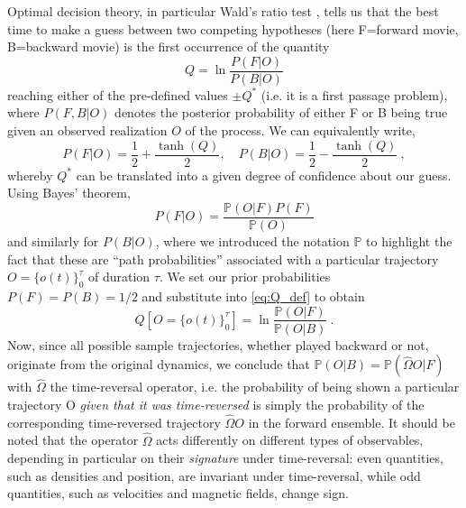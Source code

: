 Optimal decision theory, in particular Wald's ratio test \cite{PhysRevLett.115.250602}, tells us that the best time to make a guess between two competing hypotheses (here F=forward movie, B=backward movie) is the first occurrence of the quantity 
%
\begin{equation}\label{eq:Q_def}
    Q = \ln \frac{P(F|O)}{P(B|O)}
\end{equation}
%
reaching either of the pre-defined values $\pm Q^*$ (i.e. it is a first passage problem),
where $P(F,B|O)$ denotes the posterior probability of either F or B being true given an observed realization $O$ of the process. We can equivalently write,
%
\begin{equation}
    P(F|O) = \frac{1}{2} + \frac{\tanh(Q)}{2},\quad P(B|O) = \frac{1}{2} - \frac{\tanh(Q)}{2}~,
\end{equation}
%
whereby $Q^*$ can be translated into a given degree of confidence about our guess. Using Bayes' theorem,
%
\begin{equation}
    P(F|O) = \frac{\mathbb{P}(O|F)P(F)}{\mathbb{P}(O)}
\end{equation}
%
and similarly for $P(B|O)$,
where we introduced the notation $\mathbb{P}$ to highlight the fact that these are ``path probabilities'' associated with a particular trajectory $O = \{o(t)\}_0^\tau$ of duration $\tau$. We set our prior probabilities $P(F) = P(B) = 1/2$ and substitute into \eqref{eq:Q_def} to obtain
%
\begin{equation}\label{eq:Q_def_paths}
    Q[O = \{o(t)\}_0^\tau] = \ln \frac{\mathbb{P}(O|F)}{\mathbb{P}(O|B)}~.
\end{equation}
%
Now, since all possible sample trajectories, whether played backward or not, originate from the original dynamics, we conclude that $\mathbb{P}(O|B) = \mathbb{P}(\hat{\Omega} O|F)$ with $\hat{\Omega}$ the time-reversal operator, i.e. the probability of being shown a particular trajectory O \emph{given that it was time-reversed} is simply the probability of the corresponding time-reversed trajectory $\hat{\Omega}O$ in the forward ensemble. It should be noted that the operator $\hat{\Omega}$ acts differently on different types of observables, depending in particular on their \emph{signature} under time-reversal: even quantities, such as densities and position, are invariant under time-reversal, while odd quantities, such as velocities and magnetic fields, change sign.

